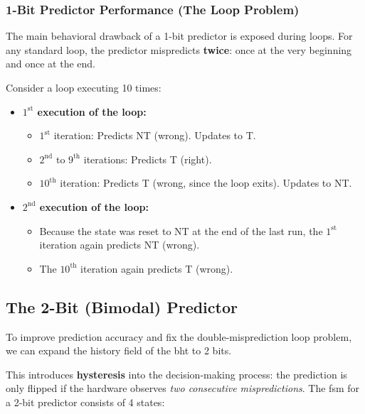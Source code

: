 \subsubsection{1-Bit Predictor Performance (The Loop Problem)}
The main behavioral drawback of a 1-bit predictor is exposed during loops. For any standard loop, the predictor mispredicts \textbf{twice}: once at the very beginning and once at the end. 

Consider a loop executing 10 times:
\begin{itemize}
    \item \textbf{\(1^{\text{st}}\) execution of the loop:} 
    \begin{itemize}
        \item \(1^{\text{st}}\) iteration: Predicts NT (wrong). Updates to T.
        \item \(2^{\text{nd}}\) to \(9^{\text{th}}\) iterations: Predicts T (right).
        \item \(10^{\text{th}}\) iteration: Predicts T (wrong, since the loop exits). Updates to NT.
    \end{itemize}
    \item \textbf{\(2^{\text{nd}}\) execution of the loop:} 
    \begin{itemize}
        \item Because the state was reset to NT at the end of the last run, the \(1^{\text{st}}\) iteration again predicts NT (wrong).
        \item The \(10^{\text{th}}\) iteration again predicts T (wrong). 
    \end{itemize}
\end{itemize}

\subsection{The 2-Bit (Bimodal) Predictor}
To improve prediction accuracy and fix the double-misprediction loop problem, we can expand the history field of the \gls{bht} to 2 bits. 

This introduces \textbf{hysteresis} into the decision-making process: the prediction is only flipped if the hardware observes \textit{two consecutive mispredictions}. The \gls{fsm} for a 2-bit predictor consists of 4 states:


